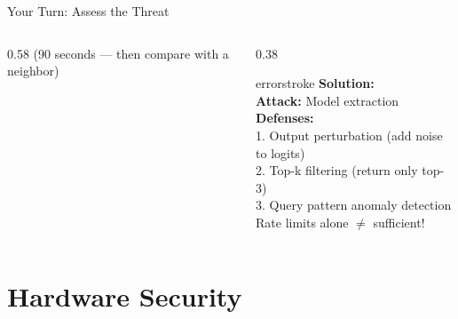 \documentclass[aspectratio=169, 12pt]{beamer}
\begin{document}
\begin{frame}{Your Turn: Assess the Threat}
\begin{columns}[T]
\begin{column}{0.58\textwidth}
    {\footnotesize\textcolor{midgray}{(90 seconds --- then compare with a neighbor)}}
  \end{column}
  \begin{column}{0.38\textwidth}
    \pause
    \begin{mlsyscard}{errorstroke}
    \textbf{Solution:}\\[0.1cm]
    {\footnotesize
    \textbf{Attack:} Model extraction\\[0.1cm]
    \textbf{Defenses:}\\
    1. Output perturbation (add noise to logits)\\
    2. Top-k filtering (return only top-3)\\
    3. Query pattern anomaly detection\\[0.1cm]
    Rate limits alone $\neq$ sufficient!
    }
    \end{mlsyscard}
  \end{column}
\end{columns}

\end{frame}

\section{Hardware Security}
\end{document}
